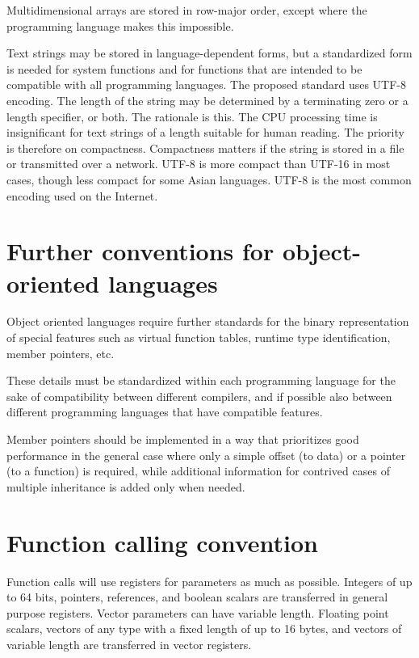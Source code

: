 \documentclass[forwardcom.tex]{subfiles}
\begin{document}
Multidimensional arrays are stored in row-major order, except where the programming language makes this impossible. 
\vspace{2mm}

Text strings may be stored in language-dependent forms, but a standardized form is needed for system functions and for functions that are intended to be compatible with all programming languages. The proposed standard uses UTF-8 encoding. The length of the string may be determined by a terminating zero or a length specifier, or both.
The rationale is this. The CPU processing time is insignificant for text strings of a length suitable for human reading. The priority is therefore on compactness. Compactness matters if the string is stored in a file or transmitted over a network. UTF-8 is more compact than UTF-16 in most cases, though less compact for some Asian languages. UTF-8 is the most common encoding used on the Internet.

\section{Further conventions for object-oriented languages}
Object oriented languages require further standards for the binary representation of special features such as virtual function tables, runtime type identification, member pointers, etc. 
\vspace{2mm}

These details must be standardized within each programming language for the sake of compatibility between different compilers, and if possible also between different programming languages that have compatible features. 
\vspace{2mm}

Member pointers should be implemented in a way that prioritizes good performance in the general case where only a simple offset (to data) or a pointer (to a function) is required, while additional information for contrived cases of multiple inheritance is added only when needed. 

\section{Function calling convention}\label{chap:functionCallingConventions}
Function calls will use registers for parameters as much as possible. Integers of up to 64 bits, pointers, references, and boolean scalars are transferred in general purpose registers. Vector parameters can have variable length. Floating point scalars, vectors of any type with a fixed length of up to 16 bytes, and vectors of variable length are transferred in vector registers. 
\vspace{2mm}
\end{document}

